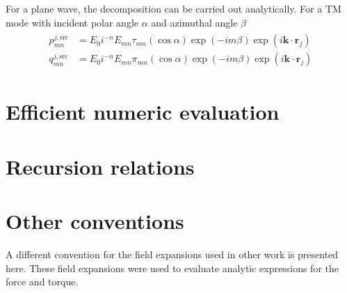 \documentclass[11pt]{article}
\begin{document}
For a plane wave, the decomposition can be carried out analytically.
For a TM mode with incident polar angle $\alpha$ and azimuthal angle $\beta$
\begin{align}
\begin{split}
p_{mn}^{j,\text{src}} &= E_0 i^{-n} E_{mn} \tau_{mn}(\cos \alpha) \exp(-im\beta) \exp(i\bm{k} \cdot \bm{r}_j) \\
q_{mn}^{j,\text{src}} &= E_0 i^{-n} E_{mn} \pi_{mn}(\cos \alpha) \exp(-im\beta) \exp(i\bm{k} \cdot \bm{r}_j)
\end{split}
\end{align}

\section{Efficient numeric evaluation}
\section{Recursion relations}

\section{Other conventions}
A different convention for the field expansions used in other work \cite{barton1989theoretical} is presented here.
These field expansions were used to evaluate analytic expressions for the force and torque.
\newline
\end{document}

